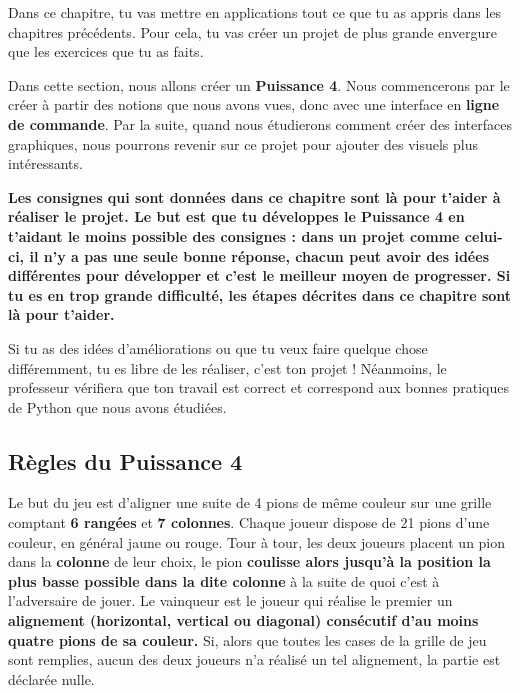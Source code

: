 \documentclass[11pt]{article}
\begin{document}
Dans ce chapitre, tu vas mettre en applications tout ce que tu as appris dans les chapitres précédents. Pour cela, tu vas créer un projet de plus grande envergure que les exercices que tu as faits.

Dans cette section, nous allons créer un \textbf{Puissance 4}. Nous commencerons par le créer à partir des notions que nous avons vues, donc avec une interface en \textbf{ligne de commande}. Par la suite, quand nous étudierons comment créer des interfaces graphiques, nous pourrons revenir sur ce projet pour ajouter des visuels plus intéressants.

\textbf{Les consignes qui sont données dans ce chapitre sont là pour t'aider à réaliser le projet. Le but est que tu développes le Puissance 4 en t'aidant le moins possible des consignes : dans un projet comme celui-ci, il n'y a pas \og une seule bonne réponse\fg{}, chacun peut avoir des idées différentes pour développer et c'est le meilleur moyen de progresser. Si tu es en trop grande difficulté, les étapes décrites dans ce chapitre sont là pour t'aider.}

Si tu as des idées d'améliorations ou que tu veux faire quelque chose différemment, tu es libre de les réaliser, c'est ton projet ! Néanmoins, le professeur vérifiera que ton travail est correct et correspond aux bonnes pratiques de Python que nous avons étudiées.

\subsection*{Règles du Puissance 4}
\label{puissance4_règles}
Le but du jeu est d'aligner une suite de 4 pions de même couleur sur une grille comptant \textbf{6 rangées} et \textbf{7 colonnes}. Chaque joueur dispose de 21 pions d'une couleur, en général jaune ou rouge. Tour à tour, les deux joueurs placent un pion dans la \textbf{colonne} de leur choix, le pion \textbf{coulisse alors jusqu'à la position la plus basse possible dans la dite colonne} à la suite de quoi c'est à l'adversaire de jouer. Le vainqueur est le joueur qui réalise le premier un \textbf{alignement (horizontal, vertical ou diagonal) consécutif d'au moins quatre pions de sa couleur.} Si, alors que toutes les cases de la grille de jeu sont remplies, aucun des deux joueurs n'a réalisé un tel alignement, la partie est déclarée nulle.
\end{document}
